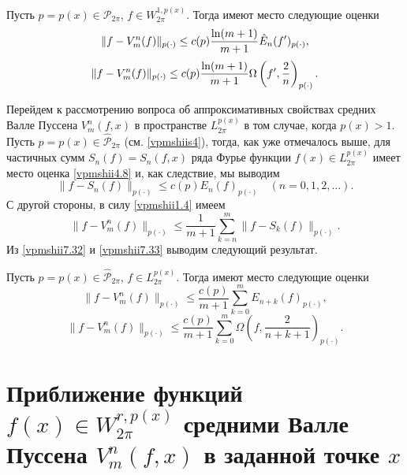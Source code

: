 \begin{theorem}\label{vpmshiit5}
Пусть  $p=p(x)\in\mathcal{  P}_{2\pi}$,  $f\in W^{1,p(x)}_{2\pi}$. Тогда имеют место следующие оценки
\begin{equation}\label{vpmshii7.23}
   \|f-V_m^n(f)\|_{p(\cdot)}\le c(p){\ln(m+1)\over m+1 }{\hat E}_n(f')_{p(\cdot)},
\end{equation}
\begin{equation}\label{vpmshii7.24}
   \|f-V_m^n(f)\|_{p(\cdot)} \le c(p){\ln(m+1)\over m+1 }\Omega\left(f',\frac2{n}\right)_{p(\cdot)}.
\end{equation}
\end{theorem}

Перейдем к рассмотрению вопроса об аппроксимативных свойствах средних Валле Пуссена $V_m^n(f,x)$ в пространстве  $L^{p(x)}_{2\pi}$
в том случае, когда  $p(x)>1$. Пусть  $p=p(x)\in\hat{\mathcal{  P}}_{2\pi}$ (см. \ref{vpmshiis4}), тогда, как уже отмечалось выше, для частичных сумм
 $S_n(f)=S_n(f,x)$ ряда Фурье функции $f(x)\in L^{p(x)}_{2\pi}$  имеет место  оценка \eqref{vpmshii4.8} и, как следствие, мы выводим
\begin{equation}\label{vpmshii7.32}
    \|f-S_n(f)\|_{p(\cdot)}\le c(p)E_n(f)_{p(\cdot)}\quad(n=0,1,2,\ldots).
 \end{equation}
С другой стороны, в силу \eqref{vpmshii1.4} имеем
\begin{equation}\label{vpmshii7.33}
  \|f-V_m^n(f)\|_{p(\cdot)}\le \frac{1}{m+1}\sum_{k=n}^m\|f-S_k(f)\|_{p(\cdot)}.
 \end{equation}
Из \eqref{vpmshii7.32} и \eqref{vpmshii7.33} выводим следующий результат.
\begin{theorem}\label{vpmshiit6}
Пусть  $p=p(x)\in\hat{\mathcal{  P}}_{2\pi}$,  $f\in L^{p(x)}_{2\pi}$. Тогда имеют место следующие оценки
$$
   \|f-V_m^n(f)\|_{p(\cdot)}\le \frac{c(p)}{m+1}\sum_{k=0}^mE_{n+k}(f)_{p(\cdot)},
$$
$$
   \|f-V_m^n(f)\|_{p(\cdot)}\le \frac{c(p)}{m+1}\sum_{k=0}^m\Omega\left(f,\frac2{n+k+1}\right)_{p(\cdot)}.
$$
\end{theorem}
\section{Приближение функций $f(x)\in W^{r,p(x)}_{2\pi}$ средними Валле Пуссена $V_m^n(f,x)$ в заданной точке $x$  }\label{vpmshiis8}

